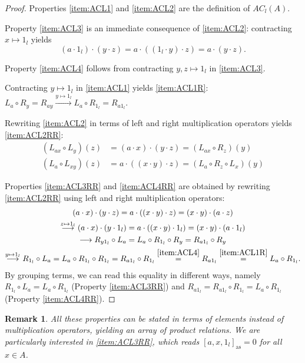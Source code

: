 \documentclass[12pt]{article}
\newtheorem{remark}[theorem]{Remark}
\begin{document}
		\begin{proof}
			Properties \ref{item:ACL1} and \ref{item:ACL2} are the definition of $AC_l(A)$.
			
			Property \ref{item:ACL3} is an immediate consequence of \ref{item:ACL2}: contracting $x\mapsto 1_l$ yields
			\begin{equation*}
				(a\cdot 1_l)\cdot(y\cdot z)=a\cdot ((1_l\cdot y)\cdot z)=a\cdot (y\cdot z).
			\end{equation*}
			
			Property \ref{item:ACL4} follows from contracting $y,z\mapsto 1_l$ in \ref{item:ACL3}.
			
			Contracting $y\mapsto 1_l$ in \ref{item:ACL1} yields \ref{item:ACL1R}: $L_a\circ R_y=R_{ay}\overset{y\mapsto 1_l}{\longrightarrow}L_a\circ R_{1_l}=R_{a1_l}$.
			
			Rewriting  \ref{item:ACL2} in terms of
			left and right multiplication operators yields \ref{item:ACL2RR}:
			\begin{align*}
				(L_{ax}\circ L_y)(z)&=(a\cdot x)\cdot (y\cdot z)=(L_{ax}\circ R_z)(y)\\
				(L_a\circ L_{xy})(z)&=a\cdot ((x\cdot y)\cdot z)=(L_a\circ R_z\circ L_x)(y)
			\end{align*}
			
			Properties \ref{item:ACL3RR} and \ref{item:ACL4RR} are obtained by rewriting \ref{item:ACL2RR} using left and right multiplication operators:
			\begin{multline*}
				(a\cdot x)\cdot (y\cdot z)=a\cdot ((x\cdot y)\cdot z)=(x\cdot y)\cdot (a\cdot z)\\
				\overset{z\mapsto 1_l}{\longrightarrow} (a\cdot x)\cdot (y\cdot 1_l)=a\cdot ((x\cdot y)\cdot 1_l)=(x\cdot y)\cdot (a\cdot 1_l)\\
				\longrightarrow R_{y1_l}\circ L_a=L_a\circ R_{1_l}\circ R_y=R_{a1_l}\circ R_y\\
				\overset{y\mapsto 1_l}{\longrightarrow} R_{1_l}\circ L_a=L_a\circ R_{1_l}\circ R_{1_l}=R_{a1_l}\circ R_{1_l}\overset{\ref{item:ACL4}}{=}R_{a1_l}\overset{\ref{item:ACL1R}}{=}L_a\circ R_{1_l}.
			\end{multline*}
			By grouping terms, we can read this equality in different ways, namely  $R_{1_l}\circ L_a=L_a\circ R_{1_l}$ (Property \ref{item:ACL3RR}) and $R_{a1_l}=R_{a1_l}\circ R_{1_l}=L_a\circ R_{1_l}$ (Property \ref{item:ACL4RR}).
		\end{proof}
		\begin{remark}\label{rem:ACL1_assoc}
			All these properties can be stated in terms of elements instead of multiplication operators, yielding an array of product relations. We are particularly interested in \textnormal{\ref{item:ACL3RR}}, which reads $[a,x,1_l]_{\mathrm{as}}=0$ for all $x\in A$.
		\end{remark}
		
\end{document}
